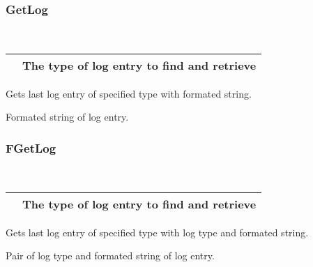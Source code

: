\documentclass[letterpaper,10pt,english]{sphinxmanual}
\begin{document}
\subsubsection{GetLog}
\label{\detokenize{log:id1}}

\begin{fulllineitems}
\label{\detokenize{log:_CPPv2N6pessum6GetLogEi}}%
\pysigstartmultiline
{}%
\pysigstopmultiline~

\begin{savenotes}\sphinxattablestart
\centering
\begin{tabulary}{\linewidth}[t]{|T|T|}
\hline

&
The type of log entry to find and retrieve
\\
\hline
\end{tabulary}
\par
\sphinxattableend\end{savenotes}

Gets last log entry of specified type with formated string.

 Formated string of log entry.

\end{fulllineitems}



\subsubsection{FGetLog}
\label{\detokenize{log:fgetlog}}

\begin{fulllineitems}
\label{\detokenize{log:_CPPv2N6pessum7FGetLogEi}}%
\pysigstartmultiline
{}%
\pysigstopmultiline~

\begin{savenotes}\sphinxattablestart
\centering
\begin{tabulary}{\linewidth}[t]{|T|T|}
\hline

&
The type of log entry to find and retrieve
\\
\hline
\end{tabulary}
\par
\sphinxattableend\end{savenotes}

Gets last log entry of specified type with log type and formated string.

 Pair of log type and formated string of log entry.

\end{fulllineitems}
\end{document}
